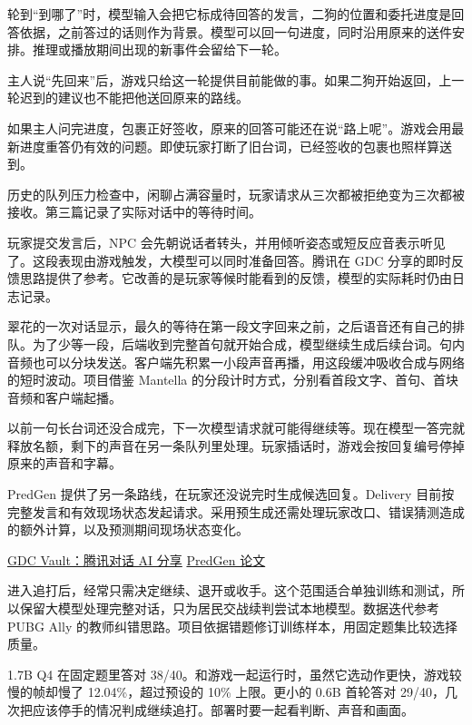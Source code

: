 \documentclass[11pt]{article}
\begin{document}
轮到“到哪了”时，模型输入会把它标成待回答的发言，二狗的位置和委托进度是回答依据，之前答过的话则作为背景。模型可以回一句进度，同时沿用原来的送件安排。推理或播放期间出现的新事件会留给下一轮。

主人说“先回来”后，游戏只给这一轮提供目前能做的事。如果二狗开始返回，上一轮迟到的建议也不能把他送回原来的路线。

如果主人问完进度，包裹正好签收，原来的回答可能还在说“路上呢”。游戏会用最新进度重答仍有效的问题。即使玩家打断了旧台词，已经签收的包裹也照样算送到。

历史的队列压力检查中，闲聊占满容量时，玩家请求从三次都被拒绝变为三次都被接收。第三篇记录了实际对话中的等待时间。



\clearpage
{}

玩家提交发言后，NPC 会先朝说话者转头，并用倾听姿态或短反应音表示听见了。这段表现由游戏触发，大模型可以同时准备回答。腾讯在 GDC 分享的即时反馈思路提供了参考。它改善的是玩家等候时能看到的反馈，模型的实际耗时仍由日志记录。

翠花的一次对话显示，最久的等待在第一段文字回来之前，之后语音还有自己的排队。为了少等一段，后端收到完整首句就开始合成，模型继续生成后续台词。句内音频也可以分块发送。客户端先积累一小段声音再播，用这段缓冲吸收合成与网络的短时波动。项目借鉴 Mantella 的分段计时方式，分别看首段文字、首句、首块音频和客户端起播。

以前一句长台词还没合成完，下一次模型请求就可能得继续等。现在模型一答完就释放名额，剩下的声音在另一条队列里处理。玩家插话时，游戏会按回复编号停掉原来的声音和字幕。

PredGen 提供了另一条路线，在玩家还没说完时生成候选回复。Delivery 目前按完整发言和有效现场状态发起请求。采用预生成还需处理玩家改口、错误猜测造成的额外计算，以及预测期间现场状态变化。

{\small\href{https://gdcvault.com/play/1035448/Tencent-Games-Developer-Summit-Conversational}{GDC Vault：腾讯对话 AI 分享}\quad
\href{https://arxiv.org/html/2506.15556v2}{PredGen 论文}}


进入追打后，经常只需决定继续、退开或收手。这个范围适合单独训练和测试，所以保留大模型处理完整对话，只为居民交战续判尝试本地模型。数据迭代参考 PUBG Ally 的教师纠错思路。项目依据错题修订训练样本，用固定题集比较选择质量。

1.7B Q4 在固定题里答对 38/40。和游戏一起运行时，虽然它选动作更快，游戏较慢的帧却慢了 12.04\%，超过预设的 10\% 上限。更小的 0.6B 首轮答对 29/40，几次把应该停手的情况判成继续追打。部署时要一起看判断、声音和画面。
\end{document}
